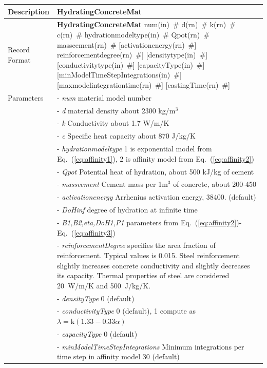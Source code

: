 \documentclass[a4paper]{article}
\newcommand{\descitem}[1]{{\noindent \bf #1}}
\newcommand{\elemparam}[2]{{{#1\tiny (#2)}~\#}}
\newcommand{\param}[1]{{\it #1}}
\newcommand{\refeq}[1]{Eq.~(\ref{#1})}
\begin{document}
\begin{table}[!htb]
\begin{tabular}{|l|p{9cm}|}
\hline
Description & HydratingConcreteMat\\
\hline
Record Format & \descitem{HydratingConcreteMat} \elemparam{num}{in} \elemparam{d}{rn} \elemparam{k}{rn} \elemparam{c}{rn} \elemparam{hydrationmodeltype}{in} \elemparam{Qpot}{rn} \elemparam{masscement}{rn} [\elemparam{activationenergy}{rn}] \elemparam{reinforcementdegree}{rn}] [\elemparam{densitytype}{in}] [\elemparam{conductivitytype}{in}] [\elemparam{capacityType}{in}]   [\elemparam{minModelTimeStepIntegrations}{in}]  [\elemparam{maxmodelintegrationtime}{rn}] [\elemparam{castingTime}{rn}]\\
Parameters &- \param{num} material model number\\
&- \param{d} material density about 2300 kg/m$^3$\\
&- \param{k} Conductivity about 1.7 W/m/K\\
&- \param{c} Specific heat capacity about 870 J/kg/K\\
&- \param{hydrationmodeltype} 1 is exponential model from \refeq{eq:affinity1}, 2 is affinity model from \refeq{eq:affinity2}\\
&- \param{Qpot} Potential heat of hydration, about 500 kJ/kg of cement\\
&- \param{masscement} Cement mass per 1m$^3$ of concrete, about 200-450\\
&- \param{activationenergy} Arrhenius activation energy, 38400. (default)\\
&- \param{DoHinf} degree of hydration at infinite time\\
&- \param{B1,B2,eta,DoH1,P1} parameters from \refeq{eq:affinity2}-\refeq{eq:affinity3}\\
&- \param{reinforcementDegree} specifies the area fraction of reinforcement. Typical values is 0.015. Steel reinforcement slightly increases concrete conductivity and slightly decreases its capacity. Thermal properties of steel are considered 20~W/m/K and 500~J/kg/K.\\
&- \param{densityType} 0 (default)\\
&- \param{conductivityType} 0 (default), 1 compute as $\lambda = \textrm{k} (1.33-0.33\alpha)$ \cite{Ruiz:01}\\
&- \param{capacityType} 0 (default)\\
&- \param{minModelTimeStepIntegrations} Minimum integrations per time step in affinity model 30 (default)\\

\end{tabular}
\end{table}
\end{document}
